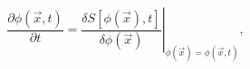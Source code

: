 \begin{equation}
\frac{\partial\phi(\vec{x},t)}{\partial t}=\left.  \frac{\delta S\left[
\phi(\vec{x}),t\right]  }{\delta\phi(\vec{x})}\right|  _{\phi(\vec{x}%
)=\phi(\vec{x},t)},\label{8}%
\end{equation}

